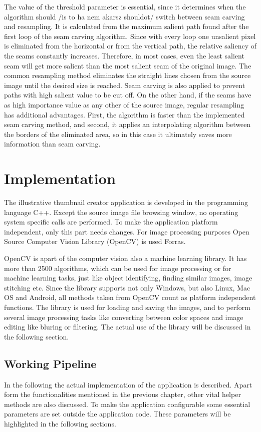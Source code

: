 \documentclass[draft,final]{vutinfth} %
\begin{document}
    The value of the threshold parameter is essential,	since it determines when the algorithm should /is to ha nem akarsz shouldot/ switch between seam carving and resampling. 
	It is calculated from the maximum salient path found after the first loop of the seam carving algorithm.
	Since with every loop one unsalient pixel is eliminated from the horizontal or from the vertical path, the relative saliency of the seams constantly increases.
	Therefore, in most cases, even the least salient seam will get more salient than the most salient seam of the original image. 
	The common resampling method eliminates the straight lines chosen from the source image until the desired size is reached.
	Seam carving is also applied to prevent paths with high salient value to be cut off.
	On the other hand, if the seams have as high importance value as any other of the source image, regular resampling has additional advantages.
	First, the algorithm is faster than the implemented seam carving method, and second, it applies an interpolating algorithm between the borders of the eliminated area, so in this case it ultimately saves more information than seam carving.   
	
	\chapter{Implementation}
	The illustrative thumbnail creator application is developed in the programming language C++.
	Except the source image file browsing window, no operating system specific calls are performed.
	To make the application platform independent, only this part needs changes.
	For image processing purposes Open Source Computer Vision Library (OpenCV) is used Forras.\par 
	OpenCV is apart of the computer vision also a machine learning library.     
	It has more than 2500 algorithms, which can be used for image processing or for machine learning tasks, just like object identifying, finding similar images, image stitching etc.
	Since the library supports not only Windows, but also Linux, Mac OS and Android, all methods taken from OpenCV count as platform independent functions.
	The library is used for loading and saving the images, and to perform several image processing tasks like converting between color spaces and image editing like bluring or filtering.
	The actual use of the library will be discussed in the following section.
	
	\section{Working Pipeline}
	In the following the actual implementation of the application is described.
	Apart form the functionalities mentioned in the previous chapter, other vital helper methods are also discussed.
	To make the application configurable some essential parameters are set outside the application code. 
	These parameters will be highlighted in the following sections.
	
\end{document}
